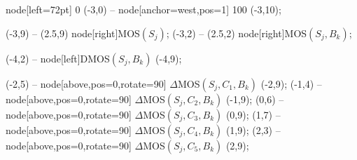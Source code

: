 node[left=72pt] {0} (-3,0) -- node[anchor=west,pos=1] {100} (-3,10);

 (-3,9) -- (2.5,9) node[right]{MOS$(S_j)$};
 (-3,2) -- (2.5,2) node[right]{MOS$(S_j,B_k)$};

 (-4,2) -- node[left]{DMOS$(S_j,B_k)$} (-4,9);

 (-2,5) 	-- node[above,pos=0,rotate=90]	{$\Delta$MOS$(S_j,C_1,B_k)$} (-2,9);
 (-1,4) 	-- node[above,pos=0,rotate=90]	{$\Delta$MOS$(S_j,C_2,B_k)$} (-1,9);
 (0,6) 	-- node[above,pos=0,rotate=90]	{$\Delta$MOS$(S_j,C_3,B_k)$} (0,9);
 (1,7) 	-- node[above,pos=0,rotate=90]	{$\Delta$MOS$(S_j,C_4,B_k)$} (1,9);
 (2,3) 	-- node[above,pos=0,rotate=90]	{$\Delta$MOS$(S_j,C_5,B_k)$} (2,9);


